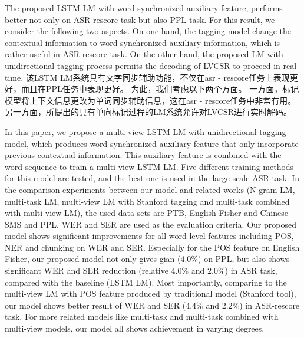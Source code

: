 The proposed LSTM LM with word-synchronized auxiliary feature, performs better not only on ASR-rescore task but also PPL task.
For this result, we consider the following two aspects.
On one hand, the tagging model change the contextual information to word-synchronized auxiliary information, which is rather useful in ASR-rescore task.
On the other hand, the proposed LM with unidirectional tagging process permits the decoding of LVCSR to proceed in real time.
该LSTM LM系统具有文字同步辅助功能，不仅在asr - rescore任务上表现更好，而且在PPL任务中表现更好。
为此，我们考虑以下两个方面。
一方面，标记模型将上下文信息更改为单词同步辅助信息，这在asr - rescore任务中非常有用。
另一方面，所提出的具有单向标记过程的LM系统允许对LVCSR进行实时解码。




In this paper, we propose a multi-view LSTM LM with unidirectional tagging model, which produces word-synchronized auxiliary feature that only incorporate previous contextual information.
This auxiliary feature is combined with the word sequence to train a multi-view LSTM LM.
Five different training methods for this model are tested,
and the best one is used in the large-scale ASR task. 
In the comparison experiments between our model and related works (N-gram LM, multi-task LM, multi-view LM with Stanford tagging and multi-task combined with multi-view LM), the used data sets are PTB, English Fisher and  Chinese SMS and PPL, WER and SER are used as the evaluation criteria.
Our proposed model shows significant improvements for all word-level features including POS, NER and chunking on WER and SER.
Especially for the POS feature on English Fisher,  our proposed model not only gives gian ($4.0\%$) on PPL, but also shows significant WER and SER reduction (relative $4.0\%$ and $2.0\%$) in ASR task, compared with the baseline (LSTM LM).
Most importantly, comparing to the multi-view LM with POS feature produced by traditional model (Stanford tool), our model shows better result of WER and SER ($4.4\%$ and $2.2\%$) in ASR-rescore task. 
For more related models like multi-task and multi-task combined with multi-view models, our model all shows achievement in varying degrees.


